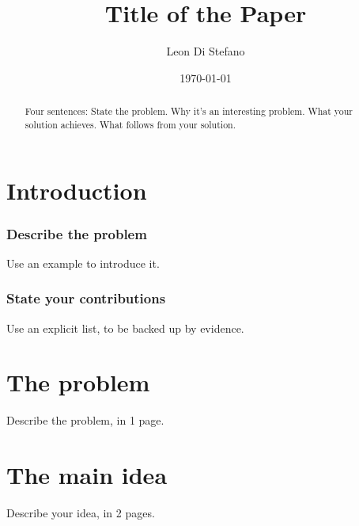 \documentclass[11pt]{article}
\title{Title of the Paper}
\author{Leon Di Stefano}
\date{\today}
\begin{document}
\maketitle

\begin{abstract}\noindent

    Four sentences: 
    State the problem. 
    Why it's an interesting problem.
    What your solution achieves.
    What follows from your solution.
    
    
    
    
\end{abstract}

\section{Introduction}
\subsubsection*{Describe the problem}

Use an example to introduce it.

\subsubsection*{State your contributions}

Use an explicit list, to be backed up by evidence.

\section{The problem}

Describe the problem, in 1 page.

\section{The main idea}


Describe your idea, in 2 pages.
\end{document}

